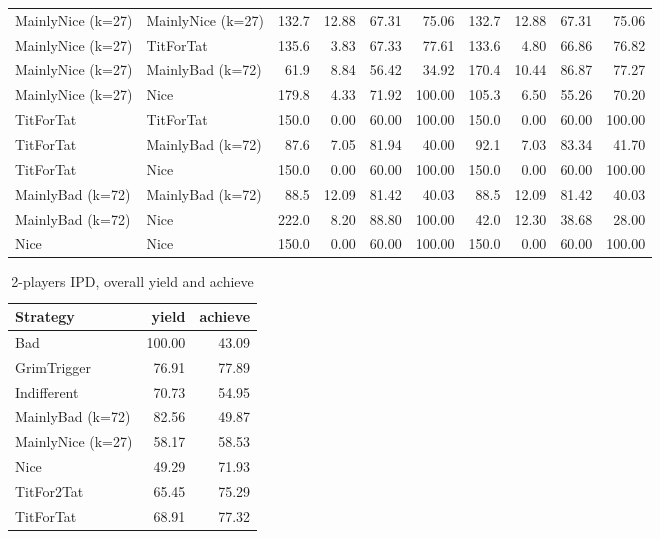 \documentclass[journal,a4paper,10pt,twoside]{IEEEtran} %
\begin{document}
\begin{table}[ht]
\begin{tabular}{ll|rrrr|rrrr}
		MainlyNice (k=27) & MainlyNice (k=27) & 132.7 & 12.88 &  67.31 &      75.06 & 132.7 & 12.88 &  67.31 &      75.06 \\
		MainlyNice (k=27) & TitForTat         & 135.6 &  3.83 &  67.33 &      77.61 & 133.6 &  4.80 &  66.86 &      76.82 \\
		MainlyNice (k=27) & MainlyBad (k=72)  &  61.9 &  8.84 &  56.42 &      34.92 & 170.4 & 10.44 &  86.87 &      77.27 \\
		MainlyNice (k=27) & Nice              & 179.8 &  4.33 &  71.92 &     100.00 & 105.3 &  6.50 &  55.26 &      70.20 \\
		TitForTat         & TitForTat         & 150.0 &  0.00 &  60.00 &     100.00 & 150.0 &  0.00 &  60.00 &     100.00 \\
		TitForTat         & MainlyBad (k=72)  &  87.6 &  7.05 &  81.94 &      40.00 &  92.1 &  7.03 &  83.34 &      41.70 \\
		TitForTat         & Nice              & 150.0 &  0.00 &  60.00 &     100.00 & 150.0 &  0.00 &  60.00 &     100.00 \\
		MainlyBad (k=72)  & MainlyBad (k=72)  &  88.5 & 12.09 &  81.42 &      40.03 &  88.5 & 12.09 &  81.42 &      40.03 \\
		MainlyBad (k=72)  & Nice              & 222.0 &  8.20 &  88.80 &     100.00 &  42.0 & 12.30 &  38.68 &      28.00 \\
		Nice              & Nice              & 150.0 &  0.00 &  60.00 &     100.00 & 150.0 &  0.00 &  60.00 &     100.00 \\ \bottomrule
	\end{tabular}
\end{table}

\begin{table}[ht]
	\caption{2-players IPD, overall yield and achieve}
	\label{tab:ipd2pavg}
	\centering
	\begin{tabular}{l|rr} \toprule
		Strategy          &  yield & achieve \\ \midrule
		Bad               & 100.00 &   43.09 \\
		GrimTrigger       &  76.91 &   77.89 \\
		Indifferent       &  70.73 &   54.95 \\
		MainlyBad (k=72)  &  82.56 &   49.87 \\
		MainlyNice (k=27) &  58.17 &   58.53 \\
		Nice              &  49.29 &   71.93 \\
		TitFor2Tat        &  65.45 &   75.29 \\
		TitForTat         &  68.91 &   77.32 \\ \bottomrule
	\end{tabular}
\end{table}
\end{document}
